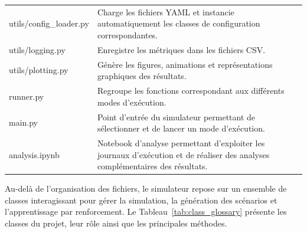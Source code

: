 \begin{longtable}{
        >{\ttfamily\small}p{}
        p{}
    }
    utils/config\_loader.py
                                             & Charge les fichiers YAML et instancie automatiquement les classes de configuration correspondantes.                                                                                                                                                 \\

    utils/logging.py
                                             & Enregistre les métriques dans les fichiers CSV.                                                                                                                                                                                                     \\

    utils/plotting.py
                                             & Génère les figures, animations et représentations graphiques des résultats.                                                                                                                                                                         \\

    runner.py
                                             & Regroupe les fonctions correspondant aux différents modes d'exécution.                                                                                                                                                                              \\

    main.py
                                             & Point d'entrée du simulateur permettant de sélectionner et de lancer un mode d'exécution.                                                                                                                                                           \\

    analysis.ipynb
                                             & Notebook d'analyse permettant d'exploiter les journaux d'exécution et de réaliser des analyses complémentaires des résultats.                                                                                                                       \\
\end{longtable}


\noindent Au-delà de l'organisation des fichiers, le simulateur repose sur un ensemble de classes interagissant pour gérer la simulation, la génération des scénarios et l'apprentissage par renforcement. Le Tableau~\ref{tab:class_glossary} présente les classes du projet, leur rôle ainsi que les principales méthodes.


